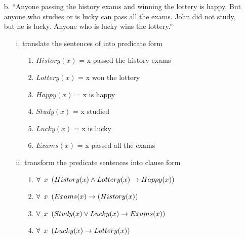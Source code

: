 \documentclass[11pt]{article}
\begin{document}
\begin{flushleft}
\begin{enumerate}
    \item[b.] “Anyone passing the history exams and winning the lottery is
        happy.  But anyone who studies or is lucky can pass all the exams.
        John did not study, but he is lucky.  Anyone who is lucky wins the
        lottery.”  

        \begin{enumerate}
            \item[i.] translate the sentences of into predicate form
                \begin{enumerate}
                    \item[1.] $History(x)$ = x passed the history exams
                    \item[2.] $Lottery(x)$ = x won the lottery
                    \item[3.] $Happy(x)$ = x is happy
                    \item[4.] $Study(x)$ = x studied
                    \item[5.] $Lucky(x)$ = x is lucky
                    \item[6.] $Exams(x)$ = x passed all the exams
                \end{enumerate}

            \item[ii.] transform the predicate sentences into clause form
                \begin{enumerate}
                    \item[1.] $\forall \hspace{0.5em} x \hspace{0.5em}
                        (History(x) \wedge Lottery(x) \rightarrow Happy(x))$
                    \item[2.] $\forall \hspace{0.5em} x \hspace{0.5em}
                        (Exams(x) \rightarrow (History(x))$
                    \item[3.] $\forall \hspace{0.5em} x \hspace{0.5em}
                        (Study(x) \vee Lucky(x) \rightarrow Exams(x))$
                    \item[4.] $\forall \hspace{0.5em} x \hspace{0.5em}
                        (Lucky(x) \rightarrow Lottery(x))$
                \end{enumerate}


\end{enumerate}
\end{enumerate}
\end{flushleft}
\end{document}
